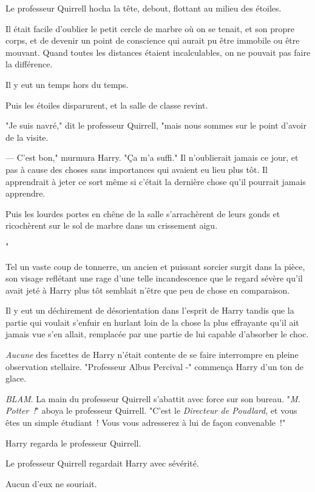 Le professeur Quirrell hocha la tête, debout, flottant au milieu des étoiles.

Il était facile d'oublier le petit cercle de marbre où on se tenait, et son propre corps, et de devenir un point de conscience qui aurait pu être immobile ou être mouvant. Quand toutes les distances étaient incalculables, on ne pouvait pas faire la différence.

Il y eut un temps hors du temps.

Puis les étoiles disparurent, et la salle de classe revint.

"Je suis navré," dit le professeur Quirrell, "mais nous sommes sur le point d'avoir de la visite.

--- C'est bon," murmura Harry. "Ça m'a suffi." Il n'oublierait jamais ce jour, et pas à cause des choses sans importances qui avaient eu lieu plus tôt. Il apprendrait à jeter ce sort même si c'était la dernière chose qu'il pourrait jamais apprendre.

Puis les lourdes portes en chêne de la salle s'arrachèrent de leurs gonds et ricochèrent sur le sol de marbre dans un crissement aigu.

"

Tel un vaste coup de tonnerre, un ancien et puissant sorcier surgit dans la pièce, son visage reflétant une rage d'une telle incandescence que le regard sévère qu'il avait jeté à Harry plus tôt semblait n'être que peu de chose en comparaison.

Il y eut un déchirement de désorientation dans l'esprit de Harry tandis que la partie qui voulait s'enfuir en hurlant loin de la chose la plus effrayante qu'il ait jamais vue s'en allait, remplacée par une partie de lui capable d'absorber le choc.

\emph{Aucune} des facettes de Harry n'était contente de se faire interrompre en pleine observation stellaire. "Professeur Albus Percival -" commença Harry d'un ton de glace.

\emph{BLAM}. La main du professeur Quirrell s'abattit avec force sur son bureau. "\emph{M. Potter~!}" aboya le professeur Quirrell. "C'est le \emph{Directeur de Poudlard}, et vous êtes un simple étudiant~! Vous vous adresserez à lui de façon convenable~!"

Harry regarda le professeur Quirrell.

Le professeur Quirrell regardait Harry avec sévérité.

Aucun d'eux ne souriait.

